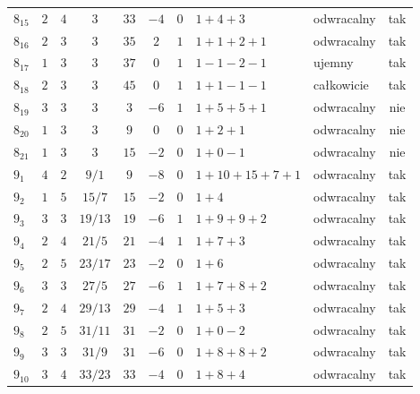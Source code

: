 \begin{longtable}{lccccccllc}
$8_{15}$    &  $2$     &  $4$  &  $3$      &  $33$   &  $-4$  &  $0$  &  $1+4+3$        &  odwracalny  &  tak  \\
$8_{16}$    &  $2$     &  $3$  &  $3$      &  $35$   &  $2$   &  $1$  &  $1+1+2+1$      &  odwracalny  &  tak  \\
$8_{17}$    &  $1$     &  $3$  &  $3$      &  $37$   &  $0$   &  $1$  &  $1-1-2-1$      &  ujemny      &  tak  \\
$8_{18}$    &  $2$     &  $3$  &  $3$      &  $45$   &  $0$   &  $1$  &  $1+1-1-1$      &  całkowicie  &  tak  \\
$8_{19}$    &  $3$     &  $3$  &  $3$      &  $3$    &  $-6$  &  $1$  &  $1+5+5+1$      &  odwracalny  &  nie  \\
$8_{20}$    &  $1$     &  $3$  &  $3$      &  $9$    &  $0$   &  $0$  &  $1+2+1$        &  odwracalny  &  nie  \\
$8_{21}$    &  $1$     &  $3$  &  $3$      &  $15$   &  $-2$  &  $0$  &  $1+0-1$        &  odwracalny  &  nie  \\
$9_{1}$     &  $4$     &  $2$  &  $9/1$    &  $9$    &  $-8$  &  $0$  &  $1+10+15+7+1$  &  odwracalny  &  tak  \\
$9_{2}$     &  $1$     &  $5$  &  $15/7$   &  $15$   &  $-2$  &  $0$  &  $1+4$          &  odwracalny  &  tak  \\
$9_{3}$     &  $3$     &  $3$  &  $19/13$  &  $19$   &  $-6$  &  $1$  &  $1+9+9+2$      &  odwracalny  &  tak  \\
$9_{4}$     &  $2$     &  $4$  &  $21/5$   &  $21$   &  $-4$  &  $1$  &  $1+7+3$        &  odwracalny  &  tak  \\
$9_{5}$     &  $2$     &  $5$  &  $23/17$  &  $23$   &  $-2$  &  $0$  &  $1+6$          &  odwracalny  &  tak  \\
$9_{6}$     &  $3$     &  $3$  &  $27/5$   &  $27$   &  $-6$  &  $1$  &  $1+7+8+2$      &  odwracalny  &  tak  \\
$9_{7}$     &  $2$     &  $4$  &  $29/13$  &  $29$   &  $-4$  &  $1$  &  $1+5+3$        &  odwracalny  &  tak  \\
$9_{8}$     &  $2$     &  $5$  &  $31/11$  &  $31$   &  $-2$  &  $0$  &  $1+0-2$        &  odwracalny  &  tak  \\
$9_{9}$     &  $3$     &  $3$  &  $31/9$   &  $31$   &  $-6$  &  $0$  &  $1+8+8+2$      &  odwracalny  &  tak  \\
$9_{10}$    &  $3$     &  $4$  &  $33/23$  &  $33$   &  $-4$  &  $0$  &  $1+8+4$        &  odwracalny  &  tak  \\

\end{longtable}
